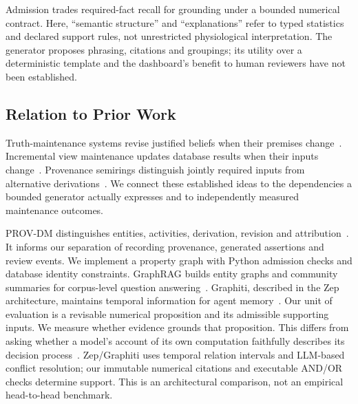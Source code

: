 \documentclass[runningheads]{llncs}
\begin{document}
Admission trades required-fact recall for grounding under a bounded numerical
contract. Here, ``semantic structure'' and ``explanations'' refer to
typed statistics and declared support rules, not unrestricted physiological
interpretation. The generator proposes phrasing, citations and groupings;
its utility over a deterministic template and the dashboard's benefit to
human reviewers have not been established.




\subsection{Relation to Prior Work}

Truth-maintenance systems revise justified beliefs when their premises
change~\cite{doyle1979}. Incremental view maintenance updates database results
when their inputs change~\cite{gupta1993}. Provenance semirings distinguish
jointly required inputs from alternative derivations~\cite{green2007}.
We connect these established ideas to the dependencies a bounded generator
actually expresses and to independently measured maintenance outcomes.

PROV-DM distinguishes entities, activities, derivation, revision and
attribution~\cite{prov2013}. It informs our separation of recording provenance,
generated assertions and review events. We implement a property graph with
Python admission checks and database identity constraints. GraphRAG builds entity
graphs and community summaries for corpus-level question answering~\cite{edge2025}.
Graphiti, described in the Zep architecture, maintains temporal information for
agent memory~\cite{rasmussen2025}. Our unit of evaluation is a revisable numerical
proposition and its admissible supporting inputs. We measure whether evidence
grounds that proposition. This differs from asking whether a model's account of
its own computation faithfully describes its decision process~\cite{turpin2023}.
Zep/Graphiti uses temporal relation intervals and LLM-based conflict resolution;
our immutable numerical citations and executable AND/OR checks determine support.
This is an architectural comparison, not an empirical head-to-head benchmark.
\end{document}
